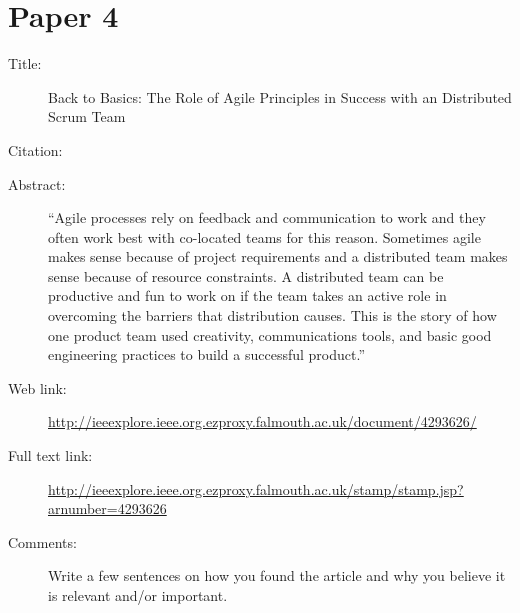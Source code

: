 \documentclass{scrartcl}
\begin{document}
\section*{Paper 4}
\begin{description}
\item[Title:] Back to Basics: The Role of Agile Principles in Success with an Distributed Scrum Team
\item[Citation:] \cite{bibtex_key}
\item[Abstract:] ``Agile processes rely on feedback and communication to work and they often work best with co-located teams for this reason. Sometimes agile makes sense because of project requirements and a distributed team makes sense because of resource constraints. A distributed team can be productive and fun to work on if the team takes an active role in overcoming the barriers that distribution causes. This is the story of how one product team used creativity, communications tools, and basic good engineering practices to build a successful product.''
\item[Web link:] \url{http://ieeexplore.ieee.org.ezproxy.falmouth.ac.uk/document/4293626/}
\item[Full text link:] \url{http://ieeexplore.ieee.org.ezproxy.falmouth.ac.uk/stamp/stamp.jsp?arnumber=4293626}
\item[Comments:] Write a few sentences on how you found the article and why you believe it is relevant and/or important.
\end{description}
\end{document}
